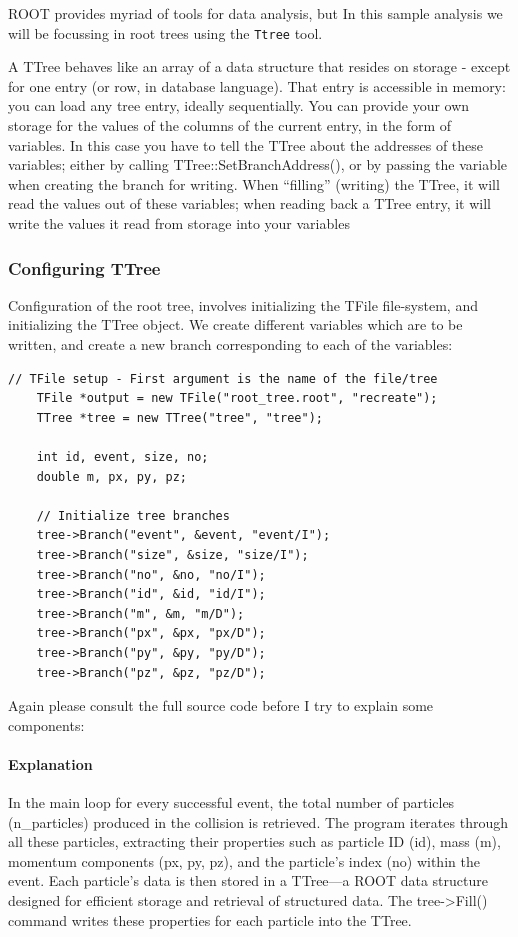 \documentclass[letterpaper,12pt]{article}
\begin{document}
\begin{spacing}{1.125}
ROOT provides myriad of tools for data analysis, but In this sample analysis we will be focussing in root trees
using the \texttt{Ttree} tool.

A TTree behaves like an array of a data structure that resides on storage -
except for one entry (or row, in database language). That entry is accessible in
memory: you can load any tree entry, ideally sequentially. You can provide your
own storage for the values of the columns of the current entry, in the form of
variables. In this case you have to tell the TTree about the addresses of these
variables; either by calling TTree::SetBranchAddress(), or by passing the
variable when creating the branch for writing. When “filling” (writing) the
TTree, it will read the values out of these variables; when reading back a TTree
entry, it will write the values it read from storage into your variables

\subsubsection{Configuring TTree}

Configuration of the root tree, involves initializing the TFile file-system, and
initializing the TTree object. We create different variables which are to be
written, and create a new branch corresponding to each of the variables:

\begin{lstlisting}[style=python, caption={Configuration of Root TTree in Pythia}]
    // TFile setup - First argument is the name of the file/tree
    TFile *output = new TFile("root_tree.root", "recreate");
    TTree *tree = new TTree("tree", "tree");

    int id, event, size, no;
    double m, px, py, pz;

    // Initialize tree branches
    tree->Branch("event", &event, "event/I");
    tree->Branch("size", &size, "size/I");
    tree->Branch("no", &no, "no/I");
    tree->Branch("id", &id, "id/I");
    tree->Branch("m", &m, "m/D");
    tree->Branch("px", &px, "px/D");
    tree->Branch("py", &py, "py/D");
    tree->Branch("pz", &pz, "pz/D");
\end{lstlisting}

Again please consult the full source code before I try to explain some
components:

\paragraph{Explanation} In the main loop for every successful event, the total number of particles (n\_particles) produced in the
collision is retrieved. The program iterates through all these particles, extracting their
properties such as particle ID (id), mass (m), momentum components (px, py, pz), and the
particle's index (no) within the event. Each particle’s data is then stored in a TTree—a
ROOT data structure designed for efficient storage and retrieval of structured data.
The tree->Fill() command writes these properties for each particle into the TTree.


\end{spacing}
\end{document}
